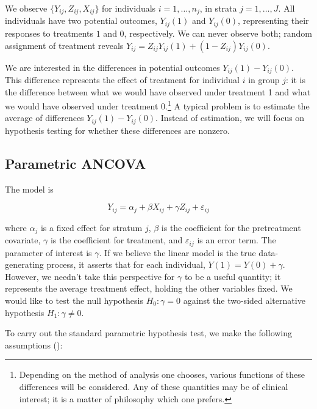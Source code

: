 \documentclass[11pt]{article}
\newcommand{\eps}{\varepsilon}
\begin{document}
We observe $\{Y_{ij}, Z_{ij}, X_{ij}\}$ for individuals $i = 1, \dots, n_j$, in strata $j = 1, \dots, J$.
All individuals have two potential outcomes, $Y_{ij}(1)$ and $Y_{ij}(0)$, representing their responses to treatments $1$ and $0$, respectively.
We can never observe both; random assignment of treatment reveals $Y_{ij} = Z_{ij}Y_{ij}(1) + (1-Z_{ij})Y_{ij}(0)$.

We are interested in the differences in potential outcomes $Y_{ij}(1) - Y_{ij}(0)$.
This difference represents the effect of treatment for individual $i$ in group $j$: it is the difference between what we would have observed under treatment 1 and what we would have observed under treatment $0$.\footnote{
Depending on the method of analysis one chooses, various functions of these differences will be considered.
Any of these quantities may be of clinical interest; it is a matter of philosophy which one prefers.}
A typical problem is to estimate the average of differences $Y_{ij}(1) - Y_{ij}(0)$.
Instead of estimation, we will focus on hypothesis testing for whether these differences are nonzero.

\subsection*{Parametric ANCOVA}

The model is

\begin{equation}\label{eqn:ancova}
Y_{ij} = \alpha_j + \beta X_{ij} + \gamma Z_{ij} + \eps_{ij}
\end{equation}

\noindent where $\alpha_j$ is a fixed effect for stratum $j$, $\beta$ is the coefficient for the pretreatment covariate,
$\gamma$ is the coefficient for treatment,
and $\eps_{ij}$ is an error term.
The parameter of interest is $\gamma$. 
If we believe the linear model is the true data-generating process, it asserts that for each individual, $Y(1) = Y(0) + \gamma$.
However, we needn't take this perspective for $\gamma$ to be a useful quantity; it represents the average treatment effect, holding the other variables fixed.
We would like to test the null hypothesis $H_0: \gamma = 0$ against
the two-sided alternative hypothesis $H_1: \gamma \neq 0$.

To carry out the standard parametric hypothesis test, we make the following assumptions (\cite{freedman_statistical_2005}):
\end{document}
